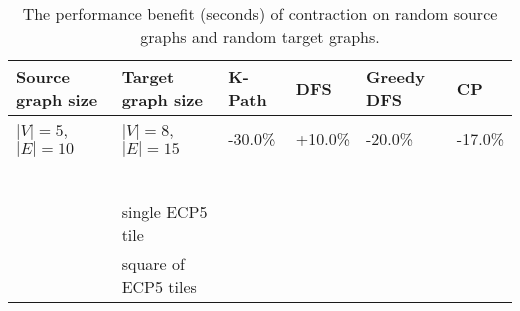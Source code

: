 \begin{table}[ht]
\centering
\begin{tabular}{|l|l|l|l|l|l|}
\hline
\textbf{Source graph size} & \textbf{Target graph size} & \textbf{K-Path} & \textbf{DFS} & \textbf{Greedy DFS} & \textbf{CP} \\ \hline
$|V|=5$, $|E|=10$          & $|V|=8$, $|E|=15$          & -30.0\%                     & +10.0\%          &  -20.0\%                      & -17.0\%               \\ \hline
&&&&&\\\hline
&&&&&\\\hline
&&&&&\\\hline
&&&&&\\\hline
&&&&&\\\hline
&&&&&\\\hline
                           & single ECP5 tile         &                           &                &                        &                \\ \hline
                                                      & square of ECP5 tiles         &                           &                &                        &                \\ \hline
\end{tabular}
\caption{The performance benefit (seconds) of contraction on random source graphs and random target graphs.}
\label{tab:contraction-performance}
\end{table}




